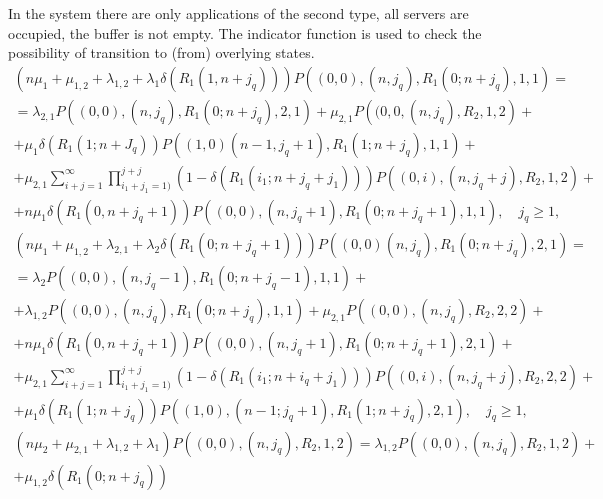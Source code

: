 \documentclass[default]{subfiles}
\begin{document}
{In the system there are only applications of the second type, all
servers are occupied, the buffer is not empty. The indicator function
is used to check the possibility of transition to (from) overlying
states.
\begin{multline}
  \left(n\mu_1+\mu_{1,2}+\lambda_{1,2}+\lambda_1 \delta\left(R_1
      (1,n+j_q)\right)\right) P\left((0,0),(n,j_q),R_1
    (0;n+j_q),1,1\right) = \\ = \lambda_{2,1} P\left((0,0),(n,j_q),R_1
    (0;n+j_q),2,1\right)+ \mu_{2,1}
  P\left((0,0,(n,j_q),R_2,1,2\right)+ \\ + \mu_1 \delta\left(R_1
    (1;n+J_q)\right) P\left((1,0)(n-1,j_q+1),R_1 (1;n+j_q),1,1\right)+
  \\ + \mu_{2,1}
  \sum\limits_{i+j=1}^{\infty}\prod\limits_{i_1+j_1=1)}^{j+j}\left(1-\delta\left(R_1
      (i_1;n+j_q+j_1) \right)\right)
  P\left((0,i),(n,j_q+j),R_2,1,2\right)+\\ + n\mu_1 \delta\left(R_1
    (0, n+j_q+1)\right) P\left((0,0),(n,j_q+1),R_1
    (0;n+j_q+1),1,1\right), \quad j_q\geqslant 1,
\label{eq:7.1}
\end{multline}
\begin{multline}
  \left(n\mu_1+\mu_{1,2}+\lambda_{2,1}+\lambda_2\delta\left(R_1
      (0;n+j_q+1)\right)\right) P\left((0,0)(n,j_q),R_1
    (0;n+j_q),2,1\right) = \\ = \lambda_2 P\left((0,0),(n,j_q-1),R_1
    (0;n+j_q-1),1,1\right)+ \\ + \lambda_{1,2} P\left((0,0),(n,j_q),R_1
    (0;n+j_q),1,1\right)+ %
  \mu_{2,1}
  P\left((0,0),(n,j_q),R_2,2,2\right)+\\ + n\mu_1 \delta\left(R_1
    (0,n+j_q+1)\right) P\left((0,0),(n,j_q+1),R_1
    (0;n+j_q+1),2,1\right) +\\ + \mu_{2,1}
  \sum\limits_{i+j=1}^{\infty}\prod\limits_{i_1+j_1=1)}^{j+j}\left(1-\delta\left(R_1
      (i_1;n+i_q+j_1) \right)\right)
  P\left((0,i),(n,j_q+j),R_2,2,2\right)+\\ + \mu_1 \delta\left(R_1
    (1;n+j_q)\right) P\left((1,0),(n-1;j_q+1),R_1
    (1;n+j_q),2,1\right), \quad j_q\geqslant 1,
\label{eq:7.2}
\end{multline}
\begin{multline}
  \left(n\mu_2+\mu_{2,1}+\lambda_{1,2}+\lambda_1\right)
  P\left((0,0),(n,j_q),R_2,1,2\right) =
  \lambda_{1,2} P\left((0,0),(n,j_q),R_2,1,2\right)+ \\ +
  \mu_{1,2}\delta\left(R_1(0;n+j_q)\right)

\end{multline}}
\end{document}

